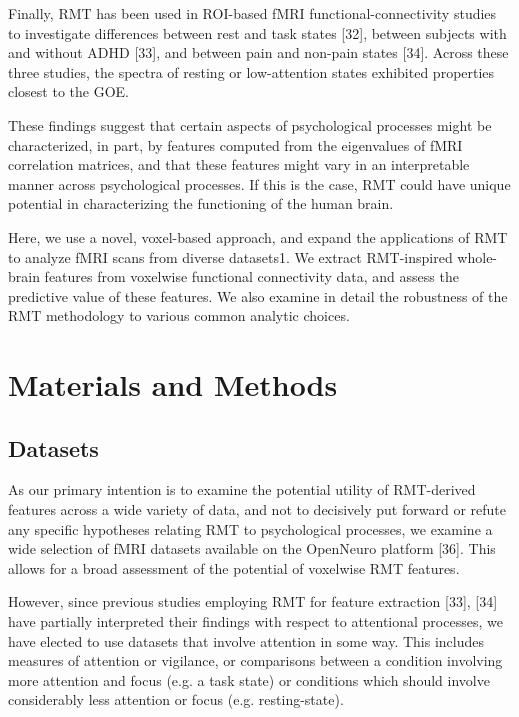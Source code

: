 Finally, RMT has been used in ROI-based fMRI functional-connectivity studies to investigate
differences between rest and task states [32], between subjects with and without ADHD [33], and
between pain and non-pain states [34]. Across these three studies, the spectra of resting or
low-attention states exhibited properties closest to the GOE.

These findings suggest that certain aspects of psychological processes might be characterized, in
part, by features computed from the eigenvalues of fMRI correlation matrices, and that these
features might vary in an interpretable manner across psychological processes. If this is the case,
RMT could have unique potential in characterizing the functioning of the human brain.

Here, we use a novel, voxel-based approach, and expand the applications of RMT to analyze fMRI scans
from  diverse datasets1. We extract RMT-inspired whole-brain features from voxelwise functional
connectivity data, and assess the predictive value of these features. We also examine in detail the
robustness of the RMT methodology to various common analytic choices.

\section{Materials and Methods}

\subsection{Datasets}

As our primary intention is to examine the potential utility of RMT-derived features across a wide
variety of data, and not to decisively put forward or refute any specific hypotheses relating RMT to
psychological processes, we examine a wide selection of fMRI datasets available on the OpenNeuro
platform [36].  This allows for a broad assessment of the potential of voxelwise RMT features.

However, since previous studies employing RMT for feature extraction [33], [34] have partially
interpreted their findings with respect to attentional processes, we have elected to use datasets
that involve attention in some way. This includes measures of attention or vigilance, or comparisons
between a condition involving more attention and focus (e.g. a task state) or conditions which
should involve considerably less attention or focus (e.g. resting-state).

